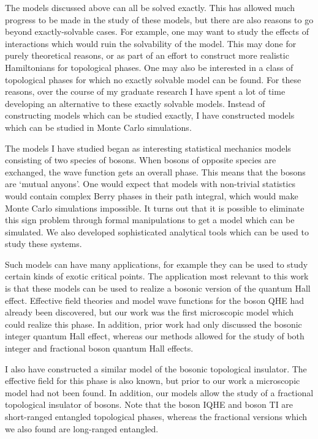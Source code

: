 The models discussed above can all be solved exactly. This has allowed much progress to be made in the study of these models, but there are also reasons to go beyond exactly-solvable cases. For example, one may want to study the effects of interactions which would ruin the solvability of the model. This may done for purely theoretical reasons, or as part of an effort to construct more realistic Hamiltonians for topological phases. One may also be interested in a class of topological phases for which no exactly solvable model can be found. For these reasons, over the course of my graduate research I have spent a lot of time developing an alternative to these exactly solvable models. Instead of constructing models which can be studied exactly, I have constructed models which can be studied in Monte Carlo simulations. 

The models I have studied began as interesting statistical mechanics models consisting of two species of bosons. When bosons of opposite species are exchanged, the wave function gets an overall phase. This means that the bosons are `mutual anyons'. One would expect that models with non-trivial statistics would contain complex Berry phases in their path integral, which would make Monte Carlo simulations impossible. It turns out that it is possible to eliminate this sign problem through formal manipulations to get a model which can be simulated. We also developed sophisticated analytical tools which can be used to study these systems.

Such models can have many applications, for example they can be used to study certain kinds of exotic critical points. The application most relevant to this work is that these models can be used to realize a bosonic version of the quantum Hall effect. Effective field theories\cite{SenthilLevin} and model wave functions\cite{LuVishwanath} for the boson QHE had already been discovered, but our work was the first microscopic model which could realize this phase. In addition, prior work had only discussed the bosonic integer quantum Hall effect, whereas our methods allowed for the study of both integer and fractional boson quantum Hall effects.

I also have constructed a similar model of the bosonic topological insulator. The effective field for this phase is also known\cite{VishwanathSenthil}, but prior to our work a microscopic model had not been found. In addition, our models allow the study of a fractional topological insulator of bosons. Note that the boson IQHE and boson TI are short-ranged entangled topological phases, whereas the fractional versions which we also found are long-ranged entangled.

